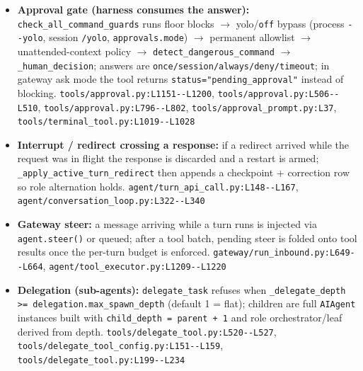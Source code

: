 \begin{itemize}
\item \textbf{Approval gate (harness consumes the answer):} \texttt{check\_\allowbreak{}all\_\allowbreak{}command\_\allowbreak{}guards} runs floor blocks $\rightarrow$ yolo/\texttt{off} bypass (process \texttt{-\allowbreak{}-\allowbreak{}yolo}, session \texttt{/\allowbreak{}yolo}, \texttt{approvals.\allowbreak{}mode}) $\rightarrow$ permanent allowlist $\rightarrow$ unattended-context policy $\rightarrow$ \texttt{detect\_\allowbreak{}dangerous\_\allowbreak{}command} $\rightarrow$ \texttt{\_\allowbreak{}human\_\allowbreak{}decision}; answers are \texttt{once/\allowbreak{}session/\allowbreak{}always/\allowbreak{}deny/\allowbreak{}timeout}; in gateway ask mode the tool returns \texttt{status="pending\_\allowbreak{}approval"} instead of blocking. \texttt{tools/\allowbreak{}approval.\allowbreak{}py:\allowbreak{}L1151-\allowbreak{}-\allowbreak{}L1200}, \texttt{tools/\allowbreak{}approval.\allowbreak{}py:\allowbreak{}L506-\allowbreak{}-\allowbreak{}L510}, \texttt{tools/\allowbreak{}approval.\allowbreak{}py:\allowbreak{}L796-\allowbreak{}-\allowbreak{}L802}, \texttt{tools/\allowbreak{}approval\_\allowbreak{}prompt.\allowbreak{}py:\allowbreak{}L37}, \texttt{tools/\allowbreak{}terminal\_\allowbreak{}tool.\allowbreak{}py:\allowbreak{}L1019-\allowbreak{}-\allowbreak{}L1028}
\item \textbf{Interrupt / redirect crossing a response:} if a redirect arrived while the request was in flight the response is discarded and a restart is armed; \texttt{\_\allowbreak{}apply\_\allowbreak{}active\_\allowbreak{}turn\_\allowbreak{}redirect} then appends a checkpoint + correction row so role alternation holds. \texttt{agent/\allowbreak{}turn\_\allowbreak{}api\_\allowbreak{}call.\allowbreak{}py:\allowbreak{}L148-\allowbreak{}-\allowbreak{}L167}, \texttt{agent/\allowbreak{}conversation\_\allowbreak{}loop.\allowbreak{}py:\allowbreak{}L322-\allowbreak{}-\allowbreak{}L340}
\item \textbf{Gateway steer:} a message arriving while a turn runs is injected via \texttt{agent.\allowbreak{}steer(\allowbreak{})} or queued; after a tool batch, pending steer is folded onto tool results once the per-turn budget is enforced. \texttt{gateway/\allowbreak{}run\_\allowbreak{}inbound.\allowbreak{}py:\allowbreak{}L649-\allowbreak{}-\allowbreak{}L664}, \texttt{agent/\allowbreak{}tool\_\allowbreak{}executor.\allowbreak{}py:\allowbreak{}L1209-\allowbreak{}-\allowbreak{}L1220}
\item \textbf{Delegation (sub-agents):} \texttt{delegate\_\allowbreak{}task} refuses when \texttt{\_\allowbreak{}delegate\_\allowbreak{}depth >= delegation.\allowbreak{}max\_\allowbreak{}spawn\_\allowbreak{}depth} (default 1 = flat); children are full \texttt{AIAgent} instances built with \texttt{child\_\allowbreak{}depth = parent + 1} and role orchestrator/leaf derived from depth. \texttt{tools/\allowbreak{}delegate\_\allowbreak{}tool.\allowbreak{}py:\allowbreak{}L520-\allowbreak{}-\allowbreak{}L527}, \texttt{tools/\allowbreak{}delegate\_\allowbreak{}tool\_\allowbreak{}config.\allowbreak{}py:\allowbreak{}L151-\allowbreak{}-\allowbreak{}L159}, \texttt{tools/\allowbreak{}delegate\_\allowbreak{}tool.\allowbreak{}py:\allowbreak{}L199-\allowbreak{}-\allowbreak{}L234}

\end{itemize}
